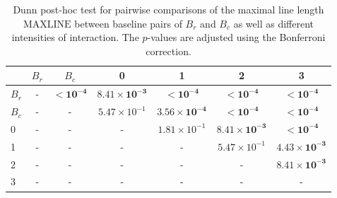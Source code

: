 \begin{table}
\centering
\caption{Dunn post-hoc test for pairwise comparisons of the maximal line length $\text{MAXLINE}$  between baseline pairs of $B_r$ and $B_c$ as well as different intensities of interaction. The $p$-values are adjusted using the Bonferroni correction.}
\label{tab:dunn_maxline}
\begin{tabular}{lcccccc}
\toprule
 & $B_r$ & $B_c$ & 0 & 1 & 2 & 3 \\
\midrule
$B_r$ & - & $\mathbf{< 10^{-4}}$ & $\mathbf{8.41 \times 10^{-3}}$ & $\mathbf{< 10^{-4}}$ & $\mathbf{< 10^{-4}}$ & $\mathbf{< 10^{-4}}$ \\
$B_c$ & - & - & $5.47 \times 10^{-1}$ & $\mathbf{3.56 \times 10^{-4}}$ & $\mathbf{< 10^{-4}}$ & $\mathbf{< 10^{-4}}$ \\
0 & - & - & - & $1.81 \times 10^{-1}$ & $\mathbf{8.41 \times 10^{-3}}$ & $\mathbf{< 10^{-4}}$ \\
1 & - & - & - & - & $5.47 \times 10^{-1}$ & $\mathbf{4.43 \times 10^{-3}}$ \\
2 & - & - & - & - & - & $\mathbf{8.41 \times 10^{-3}}$ \\
3 & - & - & - & - & - & - \\
\bottomrule
\end{tabular}
\end{table}
